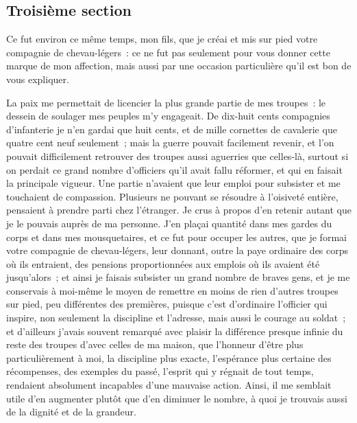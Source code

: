 \documentclass[french,twoside]{book} %
\begin{document}
\subsection[{Troisième section}]{Troisième section}
\noindent Ce fut environ ce même temps, mon fils, que je créai et mis sur pied votre compagnie de chevau-légers : ce ne fut pas seulement pour vous donner cette marque de mon affection, mais aussi par une occasion particulière qu’il est bon de vous expliquer.\par
La paix me permettait de licencier la plus grande partie de mes troupes : le dessein de soulager mes peuples m’y engageait. De dix-huit cents compagnies d’infanterie je n’en gardai que huit cents, et de mille cornettes de cavalerie que quatre cent neuf seulement ; mais la guerre pouvait facilement revenir, et l’on pouvait difficilement retrouver des troupes aussi aguerries que celles-là, surtout si on perdait ce grand nombre d’officiers qu’il avait fallu réformer, et qui en faisait la principale vigueur. Une partie n’avaient que leur emploi pour subsister et me touchaient de compassion. Plusieurs ne pouvant se résoudre à l’oisiveté entière, pensaient à prendre parti chez l’étranger. Je crus à propos d’en retenir autant que je le pouvais auprès de ma personne. J’en plaçai quantité dans mes gardes du corps et dans mes mousquetaires, et ce fut pour occuper les autres, que je formai votre compagnie de chevau-légers, leur donnant, outre la paye ordinaire des corps où ils entraient, des pensions proportionnées aux emplois où ils avaient été jusqu’alors ; et ainsi je faisais subsister un grand nombre de braves gens, et je me conservais à moi-même le moyen de remettre en moins de rien d’autres troupes sur pied, peu différentes des premières, puisque c’est d’ordinaire l’officier qui inspire, non seulement la discipline et l’adresse, mais aussi le courage au soldat ; et d’ailleurs j’avais souvent remarqué avec plaisir la différence presque infinie du reste des troupes d’avec celles de ma maison, que l’honneur d’être plus particulièrement à moi, la discipline plus exacte, l’espérance plus certaine des récompenses, des exemples du passé, l’esprit qui y régnait de tout temps, rendaient absolument incapables d’une mauvaise action. Ainsi, il me semblait utile d’en augmenter plutôt que d’en diminuer le nombre, à quoi je trouvais aussi de la dignité et de la grandeur.\par
\end{document}
